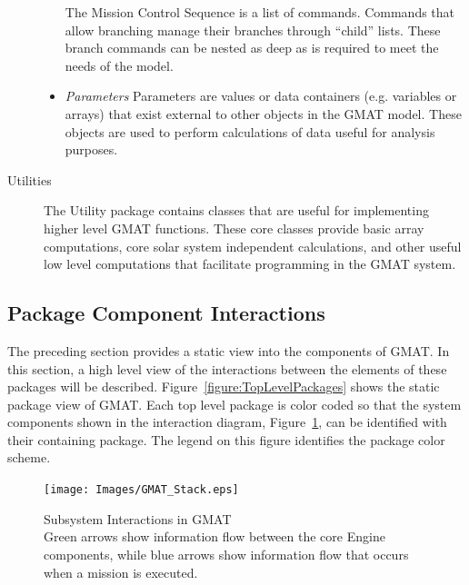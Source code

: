 \begin{description}
\begin{itemize}
    The Mission Control Sequence is a list of commands.  Commands that allow branching manage their
branches through ``child'' lists.  These branch commands can be nested as deep as is required to
meet the needs of the model.
    \item \textit{Parameters} Parameters are values or data containers (e.g.
variables or arrays) that exist external to other objects in the GMAT model.  These objects are used
to perform calculations of data useful for analysis purposes.
  \end{itemize}
  \item[Utilities] The Utility package contains classes that are useful for
implementing higher level GMAT functions.  These core classes provide basic array computations, core
solar system independent calculations, and other useful low level computations that facilitate
programming in the GMAT system.
\end{description}

\subsection{Package Component Interactions}

The preceding section provides a static view into the components of GMAT.  In this section, a
high level view of the interactions between the elements of these packages will be described.
Figure~\ref{figure:TopLevelPackages} shows the static package view of GMAT.  Each top level package
is color coded so that the system components shown in the interaction diagram,
Figure~\ref{figure:GMATStackDiagram}, can be identified with their containing package.  The legend
on this figure identifies the package color scheme.

\begin{figure}
\begin{center}
\texttt{[image: Images/GMAT\_Stack.eps]}
\caption[Subsystem Interactions in GMAT]{\label{figure:GMATStackDiagram}Subsystem Interactions in
GMAT\\Green arrows show information flow between the core Engine components, while blue arrows show
information flow that occurs when a mission is executed.}
\end{center}
\end{figure}

